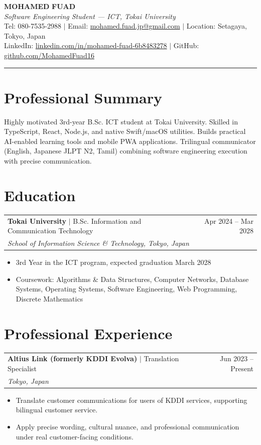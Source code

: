 \documentclass[10pt, a4paper]{article}
\makeatletter
\newcommand{\cventry}[4]{%
  \vspace{1.5pt}
  \begin{tabularx}{\linewidth}{@{}Xr@{}}
    \textbf{\color{darkgray}#1} \textcolor{medgray}{\small $|$ #2} & \textcolor{medgray}{\small #4}\\
    \textcolor{accentblue}{\small\itshape #3} & \\
  \end{tabularx}
  \vspace{-1.5pt}
}
\newenvironment{cvbullets}{%
  \begin{itemize}[leftmargin=1em, itemsep=0.2pt, topsep=0.5pt, parsep=0pt]
  \small\color{darkgray}
}{%
  \end{itemize}\vspace{1pt}
}
\makeatother
\begin{document}
\begin{center}
  {\fontsize{22}{26}\selectfont \textbf{\color{accentblue}MOHAMED} \textbf{\color{darkgray}FUAD}}\\[3pt]
  {\small\color{medgray}\textit{Software Engineering Student --- ICT, Tokai University}}\\[4pt]
  {\small\color{medgray}
    Tel: 080-7535-2988 \quad $|$ \quad
    Email: \href{mailto:mohamed.fuad.jp@gmail.com}{mohamed.fuad.jp@gmail.com} \quad $|$ \quad
    Location: Setagaya, Tokyo, Japan
  }\\[2pt]
  {\small\color{medgray}
    LinkedIn: \href{https://linkedin.com/in/mohamed-fuad-6b8483278}{linkedin.com/in/mohamed-fuad-6b8483278} \quad $|$ \quad
    GitHub: \href{https://github.com/MohamedFuad16}{github.com/MohamedFuad16}
  }
\end{center}

\vspace{-2pt}
\color{accentblue}\rule{\linewidth}{1.5pt}
\vspace{1pt}

\section{Professional Summary}
{\small\color{darkgray}
Highly motivated 3rd-year B.Sc. ICT student at Tokai University. Skilled in TypeScript, React, Node.js, and native Swift/macOS utilities. Builds practical AI-enabled learning tools and mobile PWA applications. Trilingual communicator (English, Japanese JLPT N2, Tamil) combining software engineering execution with precise communication.
}

\section{Education}
\cventry{Tokai University}{B.Sc. Information and Communication Technology}{School of Information Science \& Technology, Tokyo, Japan}{Apr 2024 -- Mar 2028}
\begin{cvbullets}
  \item 3rd Year in the ICT program, expected graduation March 2028
  \item Coursework: Algorithms \& Data Structures, Computer Networks, Database Systems, Operating Systems, Software Engineering, Web Programming, Discrete Mathematics
\end{cvbullets}

\section{Professional Experience}
\cventry{Altius Link (formerly KDDI Evolva)}{Translation Specialist}{Tokyo, Japan}{Jun 2023 -- Present}
\begin{cvbullets}
  \item Translate customer communications for users of KDDI services, supporting bilingual customer service.
  \item Apply precise wording, cultural nuance, and professional communication under real customer-facing conditions.
\end{cvbullets}
\end{document}

